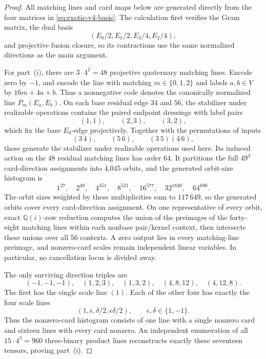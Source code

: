 \documentclass[11pt,letterpaper,onecolumn]{article}
\theoremstyle{plain}
\theoremstyle{definition}
\theoremstyle{remark}
\begin{document}
\begin{proof}
All matching lines and card maps below are generated directly from the four
matrices in \cref{eq:exotic-v4-basis}.  The calculation first verifies the
Gram matrix, the dual basis
\[
 (E_0/2,E_1/2,E_3/4,E_2/4),
\]
and projective fusion closure, so its contractions use the same normalized
directions as the main argument.

For part~\textnormal{(i)}, there are \(3\cdot4^2=48\) projective
quaternary matching lines.  Encode zero by \(-1\), and encode the line with
matching \(m\in\{0,1,2\}\) and labels \(a,b\in V\) by \(16m+4a+b\).
Thus a nonnegative code denotes the canonically normalized line
\(P_m(E_a,E_b)\).  On each base residual edge \(34\) and \(56\), the
stabilizer under realizable operations contains the paired endpoint dressings with label pairs
\[
 (1,1),\qquad(2,3),\qquad(3,2),
\]
which fix the base \(E_0\)-edge projectively.  Together with the permutations of inputs
\[
 (3\,4),\qquad(5\,6),\qquad(3\,5)(4\,6),
\]
these generate the stabilizer under realizable operations used here.  Its
induced action on the 48 residual matching lines has order \(64\).  It
partitions
the full \(49^3\) card-direction assignments into 4,045 orbits, and the generated
orbit-size histogram is
\[
 1^{27},\quad2^{49},\quad4^{351},\quad8^{521},\quad
 16^{577},\quad32^{1830},\quad64^{690}.
\]
The orbit sizes weighted by these multiplicities sum to \(117\,649\), so
the generated orbits cover every card-direction assignment.  On one representative of every
orbit, exact \(\mathbb Q(i)\)-row reduction computes the union of the
preimages of the forty-eight matching lines within each nonbase pair/kernel
context, then intersects these unions over all 56 contexts.  A zero
output lies in every matching-line preimage, and nonzero-card scales remain
independent linear variables. In particular, no cancellation locus is divided away.

The only surviving direction triples are
\begin{equation*}
 (-1,-1,-1),\quad (1,2,3),\quad(1,3,2),\quad
 (4,8,12),\quad(4,12,8).
\end{equation*}
The first has the single scale line \((1)\).  Each of the other four has
exactly the four scale lines
\begin{equation*}
 (1,\epsilon,\delta/2,\epsilon\delta/2),
 \qquad \epsilon,\delta\in\{1,-1\}.
\end{equation*}
Thus the nonzero-card histogram consists of one line with a single nonzero card
and sixteen lines with every card nonzero.  An independent enumeration of all
\(15\cdot4^3=960\) three-binary product lines reconstructs exactly these
seventeen tensors, proving part~\textnormal{(i)}.


\end{proof}
\end{document}
